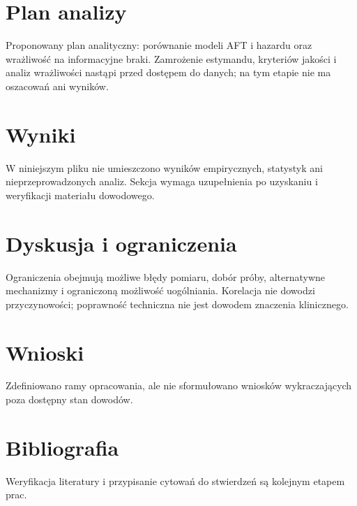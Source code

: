 \documentclass[11pt,a4paper]{article}
\begin{document}
\section{Plan analizy}

Proponowany plan analityczny: porównanie modeli AFT i hazardu oraz wrażliwość na informacyjne braki. Zamrożenie estymandu, kryteriów jakości i analiz wrażliwości nastąpi przed dostępem do danych; na tym etapie nie ma oszacowań ani wyników.

\section{Wyniki}

W niniejszym pliku nie umieszczono wyników empirycznych, statystyk ani nieprzeprowadzonych analiz. Sekcja wymaga uzupełnienia po uzyskaniu i weryfikacji materiału dowodowego.

\section{Dyskusja i ograniczenia}

Ograniczenia obejmują możliwe błędy pomiaru, dobór próby, alternatywne mechanizmy i ograniczoną możliwość uogólniania. Korelacja nie dowodzi przyczynowości; poprawność techniczna nie jest dowodem znaczenia klinicznego.

\section{Wnioski}

Zdefiniowano ramy opracowania, ale nie sformułowano wniosków wykraczających poza dostępny stan dowodów.

\section*{Bibliografia}

Weryfikacja literatury i przypisanie cytowań do stwierdzeń są kolejnym etapem prac.
\end{document}
